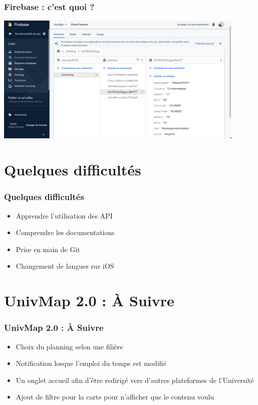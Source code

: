 \documentclass{beamer}
\begin{document}
  \begin{frame}
    \frametitle{Firebase : c'est quoi ?}

    \begin{center}
      \includegraphics[width=120mm, scale=0.5]{firebase.png}
    \end{center}

  \end{frame}


%
%
\section{Quelques difficultés}
%
%
\begin{frame}
  \frametitle{Quelques difficultés}
  \begin{itemize}
    \item Apprendre l'utilisation des API
    \item Comprendre les documentations
    \item Prise en main de Git
    \item Changement de langues sur iOS
  \end{itemize}
\end{frame}
%
%
\section{UnivMap 2.0 : À Suivre}
%
%
\begin{frame}
  \frametitle{UnivMap 2.0 : À Suivre}

  \begin{itemize}
    \item Choix du planning selon une filière
    \item Notification losque l'emploi du temps est modifié
    \item Un onglet accueil afin d'être redirigé vers d'autres plateformes de l'Université
    \item Ajout de filtre pour la carte pour n'afficher que le contenu voulu
  \end{itemize}


\end{frame}
%
%
\end{document}
